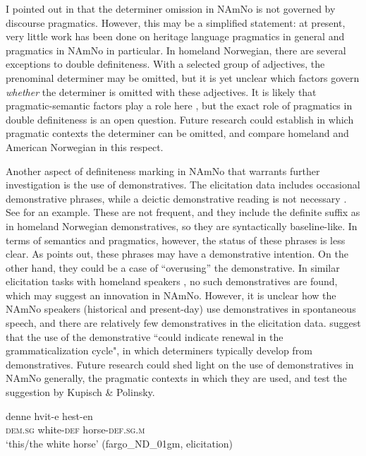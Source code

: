 \documentclass[output=paper]{langscibook}
\begin{document}
I pointed out in  that the determiner omission in NAmNo is not governed by discourse pragmatics. However, this may be a simplified statement: at present, very little work has been done on heritage language pragmatics in general and pragmatics in NAmNo in particular. In homeland Norwegian, there are several exceptions to double definiteness. With a selected group of adjectives, the prenominal determiner may be omitted, but it is yet unclear which factors govern \textit{whether} the determiner is omitted with these adjectives. It is likely that pragmatic-semantic factors play a role here \citep[see][]{vanBaal2024}, but the exact role of pragmatics in double definiteness is an open question. Future research could establish in which pragmatic contexts the determiner can be omitted, and compare homeland and American Norwegian in this respect.
 
Another aspect of definiteness marking in NAmNo that warrants further investigation is the use of demonstratives. The elicitation data includes occasional demonstrative phrases, while a deictic demonstrative reading is not necessary \citep{vanBaal2020,vanBaal2024Definiteness}. See  for an example. These are not frequent, and they include the definite suffix as in homeland Norwegian demonstratives, so they are syntactically baseline-like. In terms of semantics and pragmatics, however, the status of these phrases is less clear. As \citet{vanBaal2024Definiteness} points out, these phrases may have a demonstrative intention. On the other hand, they could be a case of “overusing” the demonstrative. In similar elicitation tasks with homeland speakers \citep[e.g.,][]{BusterudEtAl2019}, no such demonstratives are found, which may suggest an innovation in NAmNo. However, it is unclear how the NAmNo speakers (historical and present-day) use demonstratives in spontaneous speech, and there are relatively few demonstratives in the elicitation data. \citet[7]{KupischPolinsky2022} suggest that the use of the demonstrative ``could indicate renewal in the grammaticalization cycle", in which determiners typically develop from demonstratives. Future research could shed light on the use of demonstratives in NAmNo generally, the pragmatic contexts in which they are used, and test the suggestion by Kupisch \& Polinsky.
 

\ea \label{ex:vanbaal:34}
\gll denne hvit-e hest-en \\
    \textsc{dem.sg} white-\textsc{def} horse-\textsc{def.sg.m} \\
\glt `this/the white horse' (fargo\_ND\_01gm, elicitation) \\
\z 
\end{document}
